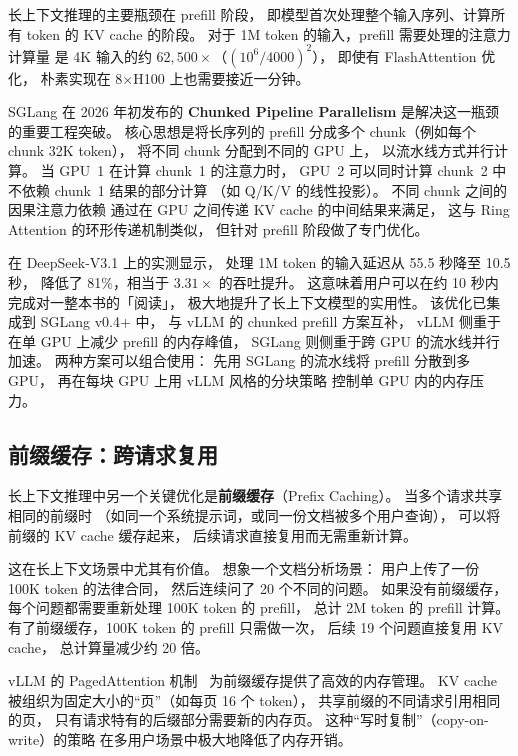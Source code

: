 长上下文推理的主要瓶颈在 prefill 阶段，
即模型首次处理整个输入序列、计算所有 token 的 KV cache 的阶段。
对于 1M token 的输入，prefill 需要处理的注意力计算量
是 4K 输入的约 $62{,}500\times$（$(10^6/4000)^2$），
即使有 FlashAttention 优化，
朴素实现在 8$\times$H100 上也需要接近一分钟。

SGLang 在 2026 年初发布的 \textbf{Chunked Pipeline Parallelism}
是解决这一瓶颈的重要工程突破。
核心思想是将长序列的 prefill
分成多个 chunk（例如每个 chunk 32K token），
将不同 chunk 分配到不同的 GPU 上，
以流水线方式并行计算。
当 GPU~1 在计算 chunk~1 的注意力时，
GPU~2 可以同时计算 chunk~2 中
不依赖 chunk~1 结果的部分计算
（如 Q/K/V 的线性投影）。
不同 chunk 之间的因果注意力依赖
通过在 GPU 之间传递 KV cache 的中间结果来满足，
这与 Ring Attention 的环形传递机制类似，
但针对 prefill 阶段做了专门优化。

在 DeepSeek-V3.1 上的实测显示，
处理 1M token 的输入延迟从 55.5 秒降至 10.5 秒，
降低了 81\%，相当于 $3.31\times$ 的吞吐提升。
这意味着用户可以在约 10 秒内完成对一整本书的「阅读」，
极大地提升了长上下文模型的实用性。
该优化已集成到 SGLang v0.4+ 中，
与 vLLM 的 chunked prefill 方案互补，
vLLM 侧重于在单 GPU 上减少 prefill 的内存峰值，
SGLang 则侧重于跨 GPU 的流水线并行加速。
两种方案可以组合使用：
先用 SGLang 的流水线将 prefill 分散到多 GPU，
再在每块 GPU 上用 vLLM 风格的分块策略
控制单 GPU 内的内存压力。

\subsection{前缀缓存：跨请求复用}

长上下文推理中另一个关键优化是\textbf{前缀缓存}（Prefix Caching）。
当多个请求共享相同的前缀时
（如同一个系统提示词，或同一份文档被多个用户查询），
可以将前缀的 KV cache 缓存起来，
后续请求直接复用而无需重新计算。

这在长上下文场景中尤其有价值。
想象一个文档分析场景：
用户上传了一份 100K token 的法律合同，
然后连续问了 20 个不同的问题。
如果没有前缀缓存，
每个问题都需要重新处理 100K token 的 prefill，
总计 2M token 的 prefill 计算。
有了前缀缓存，100K token 的 prefill 只需做一次，
后续 19 个问题直接复用 KV cache，
总计算量减少约 20 倍。

vLLM 的 PagedAttention 机制~\cite{kwon2023vllm}%
为前缀缓存提供了高效的内存管理。
KV cache 被组织为固定大小的“页”（如每页 16 个 token），
共享前缀的不同请求引用相同的页，
只有请求特有的后缀部分需要新的内存页。
这种“写时复制”（copy-on-write）的策略
在多用户场景中极大地降低了内存开销。

